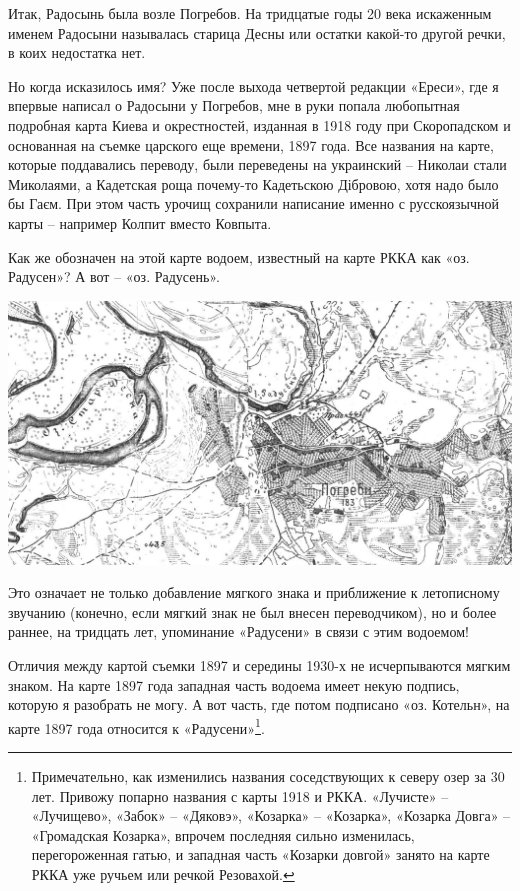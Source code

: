 Итак, Радосынь была возле Погребов. На тридцатые годы 20 века искаженным именем Радосыни называлась старица Десны или остатки какой-то другой речки, в коих недостатка нет.

Но когда исказилось имя? Уже после выхода четвертой редакции «Ереси», где я впервые написал о Радосыни у Погребов, мне в руки попала любопытная подробная карта Киева и окрестностей, изданная в 1918 году при Скоропадском и основанная на съемке царского еще времени, 1897 года. Все названия на карте, которые поддавались переводу, были переведены на украинский – Николаи стали Миколаями, а Кадетская роща почему-то Кадетьскою Дібровою, хотя надо было бы Гаєм. При этом часть урочищ сохранили написание именно с русскоязычной карты – например Колпит вместо Ковпыта.

Как же обозначен на этой карте водоем, известный на карте РККА как «оз. Радусен»? А вот – «оз. Радусень».

\begin{center}
\includegraphics[width=\linewidth]{chast-gorodki/radosyn/rad-1918.jpg}
\end{center}

Это означает не только добавление мягкого знака и приближение к летописному звучанию (конечно, если мягкий знак не был внесен переводчиком), но и более раннее, на тридцать лет, упоминание «Радусени» в связи с этим водоемом!

Отличия между картой съемки 1897 и середины 1930-х не исчерпываются мягким знаком. На карте 1897 года западная часть водоема имеет некую подпись, которую я разобрать не могу. А вот часть, где потом подписано «оз. Котельн», на карте 1897 года относится к «Радусени»\footnote{Примечательно, как изменились названия соседствующих к северу озер за 30 лет. Привожу попарно названия с карты 1918 и РККА. «Лучисте» – «Лучищево», «Забок» – «Дяковэ», «Козарка» – «Козарка», «Козарка Довга» – «Громадская Козарка», впрочем последняя сильно изменилась, перегороженная гатью, и западная часть «Козарки довгой» занято на карте РККА уже ручьем или речкой Резовахой.}.  

